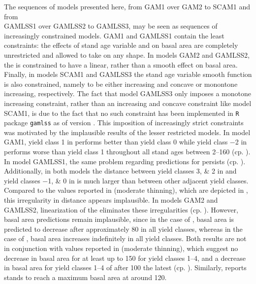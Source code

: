 The sequences of models presented here, from GAM1 over GAM2 to SCAM1 and from \\
GAMLSS1 over GAMLSS2 to GAMLSS3, may be seen as sequences of increasingly constrained models.  GAM1 and GAMLSS1 contain the least constraints:  the effects of stand age variable and \ProductivityIndexVariableText{} on basal area are completely unrestricted and allowed to take on any shape.  In models GAM2 and GAMLSS2, the \ProductivityIndexVariableText{} is constrained to have a linear, rather than a smooth effect on basal area.  Finally, in models SCAM1 and GAMLSS3 the stand age variable smooth function is also constrained, namely to be either increasing and concave or monontone increasing, respectively.  The fact that model GAMLSS3 only imposes a monotone increasing constraint, rather than an increasing and concave constraint like model SCAM1, is due to the fact that no such constraint has been implemented in \texttt{R} package \texttt{gamlss} as of version \gamlssPackageVersion{}.
This imposition of increasingly strict constraints was motivated by the implausible results of the lesser restricted models.
In model GAM1, yield class \num{1} in \Beech{} performs better than yield class \num{0} while
yield class \num{-2} in \Spruce{} performs worse than yield class \num{1} throughout all stand ages between \SIrange{2}{160}{\year} (cp. ).
In model GAMLSS1, the same problem regarding predictions for \Beech{} persists (cp. ).  Additionally, in both models the distance between yield classes \numlist{3;2} in \Beech{} and yield classes \numlist{-1;0} in \Spruce{} is much larger than between other adjacent yield classes.  Compared to the values reported in \textcite{Schober1995} (moderate thinning), which are depicted in , this irregularity in distance appears implausible.
In models GAM2 and GAMLSS2, linearization of the \ProductivityIndexVariableText{} eliminates these irregularities (cp. ).  However, basal area predictions remain implausible, since in the case of \Beech{}, basal area is predicted to decrease after approximately \SI{80}{\year} in all yield classes, whereas in the case of \Spruce{}, basal area increases indefinitely in all yield classes.  Both results are not in conjunction with values reported in \textcite{Schober1995} (moderate thinning), which suggest no decrease in basal area for \Beech{} at least up to \SI{150}{\year} for yield classes \numrange{1}{4}, and a decrease in basal area for yield classes \numrange{1}{4} of \Spruce{} after \SI{100}{\year} the latest (cp. ).  Similarly, \textcite{Franz1965} reports \Spruce{} stands to reach a maximum basal area at around \SI{120}{\year}.

